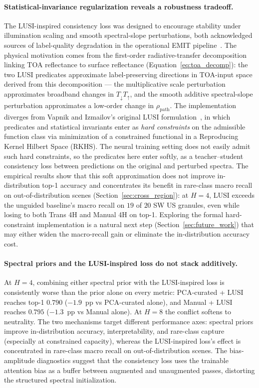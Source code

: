 \documentclass[preprint,12pt]{elsarticle}
\begin{document}
\paragraph{Statistical-invariance regularization reveals a robustness tradeoff.}
The LUSI-inspired consistency loss was designed to encourage stability under illumination scaling and smooth spectral-slope perturbations, both acknowledged sources of label-quality degradation in the operational EMIT pipeline~\cite{emit_l2a_atbd, emit_l2b_atbd}.
The physical motivation comes from the first-order radiative-transfer decomposition linking TOA reflectance to surface reflectance (Equation~\ref{eq:toa_decomp}): the two LUSI predicates approximate label-preserving directions in TOA-input space derived from this decomposition --- the multiplicative scale perturbation approximates broadband changes in $T_{\downarrow}T_{\uparrow}$, and the smooth additive spectral-slope perturbation approximates a low-order change in $\rho_{\mathrm{path}}$.
The implementation diverges from Vapnik and Izmailov's original LUSI formulation~\cite{vapnik2020}, in which predicates and statistical invariants enter as \emph{hard constraints} on the admissible function class via minimization of a constrained functional in a Reproducing Kernel Hilbert Space (RKHS).
The neural training setting does not easily admit such hard constraints, so the predicates here enter softly, as a teacher--student consistency loss between predictions on the original and perturbed spectra.
The empirical results show that this soft approximation does not improve in-distribution top-1 accuracy and concentrates its benefit in rare-class macro recall on out-of-distribution scenes (Section~\ref{sec:cross_region}): at $H = 4$, LUSI exceeds the unguided baseline's macro recall on $19$ of $20$ SW US granules, even while losing to both Trans 4H and Manual 4H on top-1.
Exploring the formal hard-constraint implementation is a natural next step (Section~\ref{sec:future_work}) that may either widen the macro-recall gain or eliminate the in-distribution accuracy cost.

\paragraph{Spectral priors and the LUSI-inspired loss do not stack additively.}
At $H = 4$, combining either spectral prior with the LUSI-inspired loss is consistently worse than the prior alone on every metric: PCA-curated + LUSI reaches top-1 $0.790$ ($-1.9$~pp vs PCA-curated alone), and Manual + LUSI reaches $0.795$ ($-1.3$~pp vs Manual alone).
At $H = 8$ the conflict softens to neutrality.
The two mechanisms target different performance axes: spectral priors improve in-distribution accuracy, interpretability, and rare-class capture (especially at constrained capacity), whereas the LUSI-inspired loss's effect is concentrated in rare-class macro recall on out-of-distribution scenes.
The bias-amplitude diagnostics suggest that the consistency loss uses the trainable attention bias as a buffer between augmented and unaugmented passes, distorting the structured spectral initialization.
\end{document}
